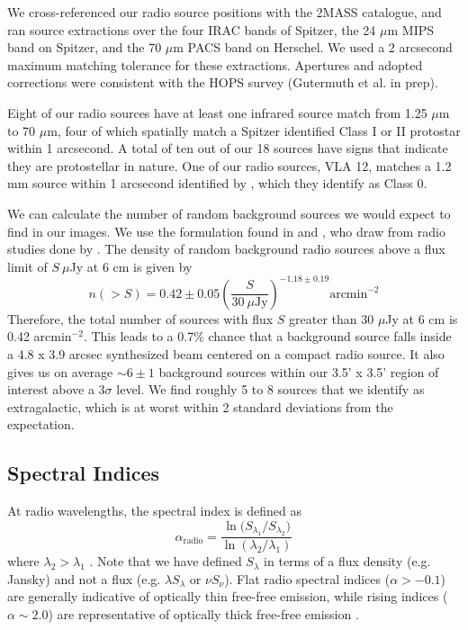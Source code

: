\documentclass[apj]{emulateapj}
\begin{document}
We cross-referenced our radio source positions with the 2MASS catalogue, and ran source extractions over the four IRAC bands of Spitzer, the 24 $\mu$m MIPS band on Spitzer, and the 70 $\mu$m PACS band on Herschel. We used a 2 arcsecond maximum matching tolerance for these extractions. Apertures and adopted corrections were consistent with the HOPS survey (Gutermuth et al. in prep).

Eight of our radio sources have at least one infrared source match from 1.25 $\mu$m to 70 $\mu$m, four of which spatially match a Spitzer identified Class I or II protostar within 1 arcsecond. A total of ten out of our 18 sources have signs that indicate they are protostellar in nature. One of our radio sources, VLA 12, matches a 1.2 mm source within 1 arcsecond identified by \citep{Maury11}, which they identify as Class 0.

We can calculate the number of random background sources we would expect to find in our images. We use the formulation found in \citet{Shirley07} and \citet{Dzib13}, who draw from radio studies done by \citet{Fomalont91}. The density of random background radio sources above a flux limit of $S\ \mu$Jy at 6 cm is given by 
\begin{equation*}
n(>S) = 0.42\pm0.05\left(\frac{S}{30\ \mu \text{Jy}}\right)^{-1.18\pm0.19} \text{arcmin}^{-2}
\end{equation*}
Therefore, the total number of sources with flux $S$ greater than 30 $\mu$Jy at 6 cm is 0.42 arcmin$^{-2}$. This leads to a 0.7\% chance that a background source falls inside a 4.8 x 3.9 arcsec synthesized beam centered on a compact radio source. It also gives us on average $\sim6\pm1$ background sources within our 3.5' x 3.5' region of interest above a 3$\sigma$ level. We find roughly 5 to 8 sources that we identify as extragalactic, which is at worst within 2 standard deviations from the expectation.

\subsection{Spectral Indices}
\label{sec:spix}
At radio wavelengths, the spectral index is defined as
\begin{equation}
\label{eq:radio_spix}
\alpha_{\text{radio}} = \frac{\ln({S_{\lambda_{1}}/S_{\lambda_{2}})}}{\ln({\lambda_{2}/\lambda_{1}})}
\end{equation}
where $\lambda_{2} > \lambda_{1}$ \citep{Shirley07}. Note that we have defined $S_{\lambda}$ in terms of a flux density (e.g. Jansky) and not a flux (e.g. $\lambda S_{\lambda}$ or $\nu S_{\nu}$). Flat radio spectral indices ($\alpha > -0.1$) are generally indicative of optically thin free-free emission, while rising indices ($\alpha \sim 2.0$) are representative of optically thick free-free emission \citep{Anglada98}. 
\end{document}
